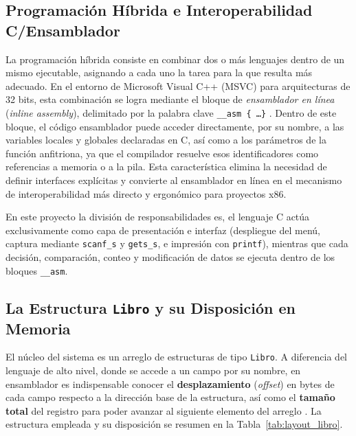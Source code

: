 \documentclass[a4paper,12pt]{article}
\begin{document}
\subsection{Programación Híbrida e Interoperabilidad C/Ensamblador}
La programación híbrida consiste en combinar dos o más lenguajes dentro de un mismo ejecutable, asignando a cada uno la tarea para la que resulta más adecuado. En el entorno de Microsoft Visual C++ (MSVC) para arquitecturas de 32 bits, esta combinación se logra mediante el bloque de \textit{ensamblador en línea} (\textit{inline assembly}), delimitado por la palabra clave \texttt{\_\_asm \{ \dots \}} \cite{irvine2011assembly}. Dentro de este bloque, el código ensamblador puede acceder directamente, por su nombre, a las variables locales y globales declaradas en C, así como a los parámetros de la función anfitriona, ya que el compilador resuelve esos identificadores como referencias a memoria o a la pila. Esta característica elimina la necesidad de definir interfaces explícitas y convierte al ensamblador en línea en el mecanismo de interoperabilidad más directo y ergonómico para proyectos x86.

En este proyecto la división de responsabilidades es, el lenguaje C actúa exclusivamente como capa de presentación e interfaz (despliegue del menú, captura mediante \texttt{scanf\_s} y \texttt{gets\_s}, e impresión con \texttt{printf}), mientras que cada decisión, comparación, conteo y modificación de datos se ejecuta dentro de los bloques \texttt{\_\_asm}.

\subsection{La Estructura \texttt{Libro} y su Disposición en Memoria}
El núcleo del sistema es un arreglo de estructuras de tipo \texttt{Libro}. A diferencia del lenguaje de alto nivel, donde se accede a un campo por su nombre, en ensamblador es indispensable conocer el \textbf{desplazamiento} (\textit{offset}) en bytes de cada campo respecto a la dirección base de la estructura, así como el \textbf{tamaño total} del registro para poder avanzar al siguiente elemento del arreglo \cite{stallings2019computer}. La estructura empleada y su disposición se resumen en la Tabla~\ref{tab:layout_libro}.
\end{document}
